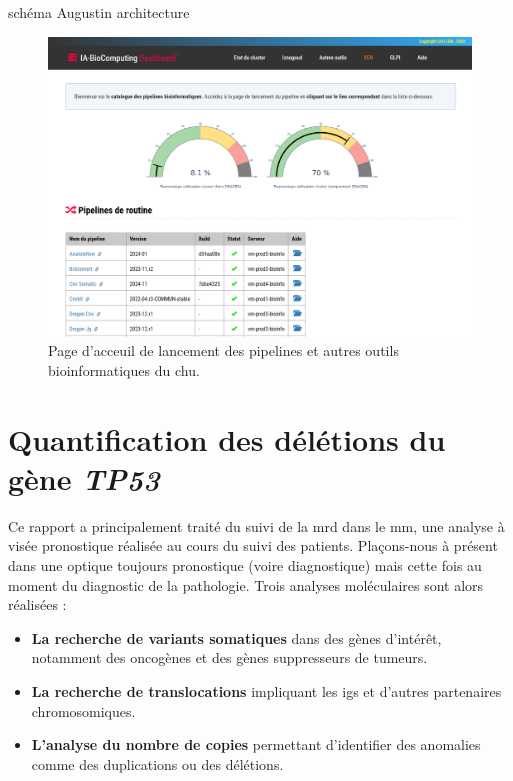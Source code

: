 schéma Augustin architecture

\begin{figure}[H]
    \centering
    \includegraphics[width=1\textwidth]{images/dashboard_bioinfo.png}
    \caption{
        Page d'acceuil de lancement des pipelines et autres outils bioinformatiques du \gls{chu}.
    }
    \label{fig:bioinfo-dashboard}
\end{figure}

\section{Quantification des délétions du gène \textit{TP53}}

Ce rapport a principalement traité du suivi de la \gls{mrd} dans le \gls{mm},
une analyse à visée pronostique réalisée au cours du suivi des patients.
Plaçons-nous à présent dans une optique toujours pronostique (voire
diagnostique) mais cette fois au moment du diagnostic de la pathologie. Trois
analyses moléculaires sont alors réalisées :

\begin{itemize}
    \item \textbf{La recherche de variants somatiques} dans des gènes
          d'intérêt, notamment des oncogènes et des gènes suppresseurs de
          tumeurs.
    \item \textbf{La recherche de translocations} impliquant les \glspl{ig} et
          d'autres partenaires chromosomiques.
    \item \textbf{L'analyse du nombre de copies} permettant d'identifier des
          anomalies comme des duplications ou des délétions.
\end{itemize}

